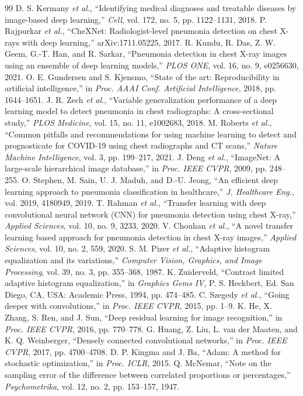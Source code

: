 \documentclass[conference]{IEEEtran}
\begin{document}
\begin{thebibliography}{99}
 D. S. Kermany \textit{et al.}, ``Identifying medical diagnoses and treatable diseases by image-based deep learning,'' \textit{Cell}, vol. 172, no. 5, pp. 1122--1131, 2018.
 P. Rajpurkar \textit{et al.}, ``CheXNet: Radiologist-level pneumonia detection on chest X-rays with deep learning,'' arXiv:1711.05225, 2017.
 R. Kundu, R. Das, Z. W. Geem, G.-T. Han, and R. Sarkar, ``Pneumonia detection in chest X-ray images using an ensemble of deep learning models,'' \textit{PLOS ONE}, vol. 16, no. 9, e0256630, 2021.
 O. E. Gundersen and S. Kjensmo, ``State of the art: Reproducibility in artificial intelligence,'' in \textit{Proc. AAAI Conf. Artificial Intelligence}, 2018, pp. 1644--1651.
 J. R. Zech \textit{et al.}, ``Variable generalization performance of a deep learning model to detect pneumonia in chest radiographs: A cross-sectional study,'' \textit{PLOS Medicine}, vol. 15, no. 11, e1002683, 2018.
 M. Roberts \textit{et al.}, ``Common pitfalls and recommendations for using machine learning to detect and prognosticate for COVID-19 using chest radiographs and CT scans,'' \textit{Nature Machine Intelligence}, vol. 3, pp. 199--217, 2021.
 J. Deng \textit{et al.}, ``ImageNet: A large-scale hierarchical image database,'' in \textit{Proc. IEEE CVPR}, 2009, pp. 248--255.
 O. Stephen, M. Sain, U. J. Maduh, and D.-U. Jeong, ``An efficient deep learning approach to pneumonia classification in healthcare,'' \textit{J. Healthcare Eng.}, vol. 2019, 4180949, 2019.
 T. Rahman \textit{et al.}, ``Transfer learning with deep convolutional neural network (CNN) for pneumonia detection using chest X-ray,'' \textit{Applied Sciences}, vol. 10, no. 9, 3233, 2020.
 V. Chouhan \textit{et al.}, ``A novel transfer learning based approach for pneumonia detection in chest X-ray images,'' \textit{Applied Sciences}, vol. 10, no. 2, 559, 2020.
 S. M. Pizer \textit{et al.}, ``Adaptive histogram equalization and its variations,'' \textit{Computer Vision, Graphics, and Image Processing}, vol. 39, no. 3, pp. 355--368, 1987.
 K. Zuiderveld, ``Contrast limited adaptive histogram equalization,'' in \textit{Graphics Gems IV}, P. S. Heckbert, Ed. San Diego, CA, USA: Academic Press, 1994, pp. 474--485.
 C. Szegedy \textit{et al.}, ``Going deeper with convolutions,'' in \textit{Proc. IEEE CVPR}, 2015, pp. 1--9.
 K. He, X. Zhang, S. Ren, and J. Sun, ``Deep residual learning for image recognition,'' in \textit{Proc. IEEE CVPR}, 2016, pp. 770--778.
 G. Huang, Z. Liu, L. van der Maaten, and K. Q. Weinberger, ``Densely connected convolutional networks,'' in \textit{Proc. IEEE CVPR}, 2017, pp. 4700--4708.
 D. P. Kingma and J. Ba, ``Adam: A method for stochastic optimization,'' in \textit{Proc. ICLR}, 2015.
 Q. McNemar, ``Note on the sampling error of the difference between correlated proportions or percentages,'' \textit{Psychometrika}, vol. 12, no. 2, pp. 153--157, 1947.
\end{thebibliography}
\end{document}
